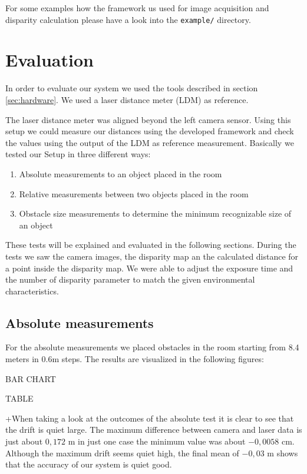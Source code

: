 \documentclass[11pt]{article}
\begin{document}
\bigskip
For some examples how the framework us used for image acquisition and disparity calculation please have a look into the \texttt{example/} directory. %


\section{Evaluation}
In order to evaluate our system we used the tools described in section \ref{sec:hardware}. We used a laser distance meter (LDM) as reference. 

The laser distance meter was aligned beyond the left camera sensor. Using this setup we could measure our distances using the developed framework and check the values using the output of the LDM as reference measurement. Basically we tested our Setup in three different ways:

\begin{enumerate}
  \item Absolute measurements to an object placed in the room
  \item Relative measurements between two objects placed in the room
  \item Obstacle size measurements to determine the minimum recognizable size of an object
\end{enumerate}

These tests will be explained and evaluated in the following sections. During the tests we saw the camera images, the disparity map an the calculated distance for a point inside the disparity map. We were able to adjust the exposure time and the number of disparity parameter to match the given environmental characteristics.

\subsection{Absolute measurements}
For the absolute measurements we placed obstacles in the room starting from 8.4 meters in 0.6m steps. The results are visualized in the following figures:

BAR CHART

TABLE 

+When taking a look at the outcomes of the absolute test it is clear to see that the drift is quiet large. The maximum difference between camera and laser data is just about $0,172$ m in just one case the minimum value was about $-0,0058$ cm. Although the maximum drift seems quiet high, the final mean of $-0,03$ m shows that the accuracy of our system is quiet good.
\end{document}
